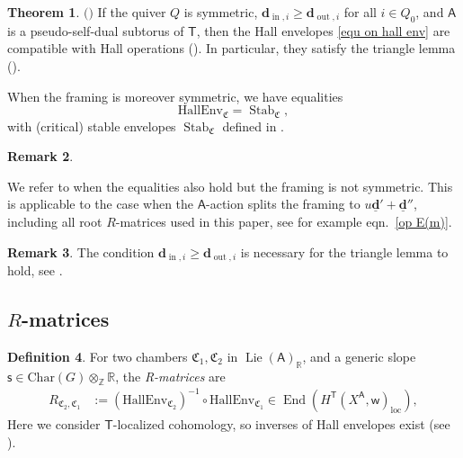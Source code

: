 \documentclass[10pt]{amsart}
\theoremstyle{definition}
\newtheorem{Theorem}{Theorem}[section]
\newtheorem{Definition}[Theorem]{Definition}
\newtheorem{Remark}[Theorem]{Remark}
\numberwithin{equation}{section}
\newcommand{\HallEnv}{\mathrm{HallEnv}}
\newcommand{\bR}{\mathbb{R}}
\newcommand{\bZ}{\mathbb{Z}}
\newcommand{\bd}{\mathbf{d}}
\newcommand{\fC}{\mathfrak{C}}
\newcommand{\sA}{\mathsf{A}}
\newcommand{\sT}{\mathsf{T}}
\newcommand{\sw}{\mathsf{w}}
\newcommand{\End}{\operatorname{End}}
\newcommand{\Lie}{\operatorname{Lie}}
\newcommand{\Stab}{\operatorname{Stab}}
\newcommand{\In}{\operatorname{in}}
\newcommand{\Out}{\operatorname{out}}
\begin{document}
\begin{Theorem}
$($\cite[Thms.~9.20, 4.22, 5.5]{COZZ}$)$
\label{thm AFSQV}
If the quiver $Q$ is symmetric, $\bd_{\In,i}\geqslant \bd_{\Out,i}$ for all $i\in Q_0$, 
and $\sA$ is a pseudo-self-dual subtorus of $\sT$, then the Hall envelopes \eqref{equ on hall env}
are compatible with Hall operations (\cite[Def.~9.4]{COZZ}). In particular, they satisfy the triangle lemma (\cite[Lem.~9.6]{COZZ}). 

When the framing is moreover symmetric, we have equalities
$$\HallEnv_\fC=\Stab_\fC, $$
with (critical) stable envelopes $\Stab_\fC$ defined in \cite[Defs.~3.4]{COZZ}. 
\end{Theorem}
\begin{Remark}\label{rmk on hallequstab}

We refer to \cite[Props.~9.23, 9.24]{COZZ} when the equalities also hold but the framing is not symmetric. 
This is applicable to the case when the $\sA$-action splits the framing to $u\underline{\bd}'+\underline{\bd}''$, including all root
$R$-matrices used in this paper, see for example eqn.~\eqref{op E(m)}.
\end{Remark}

\begin{Remark}
The condition $\bd_{\In,i}\geqslant \bd_{\Out,i}$ is necessary for the triangle lemma to hold, see \cite[Ex.~9.25,~Prop.~9.26]{COZZ}.
\end{Remark}

\subsection{$R$-matrices}

\begin{Definition}
For two chambers $\fC_1,\fC_2$ in $\Lie(\sA)_\bR$, and a generic slope $\mathsf s\in \mathrm{Char}(G)\otimes_\bZ\bR$, the \textit{R-matrices} are
\begin{align*}
    R_{\fC_2,\fC_1}&:=(\HallEnv_{\fC_2})^{-1}\circ \HallEnv_{\fC_1}\in \End\left(H^\sT(X^\sA,\sw )_{\mathrm{loc}}\right),
\end{align*}
Here we consider $\sT$-localized cohomology, so inverses of Hall envelopes exist (see \cite[Rmk.~9.5]{COZZ}).
\end{Definition}
\end{document}

